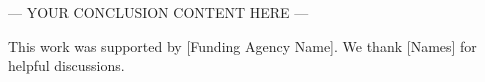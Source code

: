 \documentclass{article}
\begin{document}
--- YOUR CONCLUSION CONTENT HERE ---




\begin{ack}


This work was supported by [Funding Agency Name]. We thank [Names] for helpful discussions.
\end{ack}


\appendix

\appendix

\end{document}
